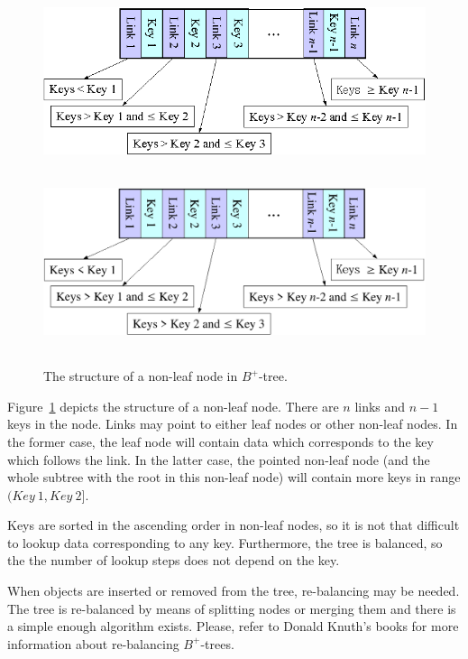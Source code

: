 %
%
\begin{figure}[h]
\begin{center}
\begin{htmlonly}
\includegraphics{pics/node-01.png}
\end{htmlonly}
\includegraphics[width=160mm,height=60mm]{pics/node-01.pdf}
\end{center}
\caption{The structure of a non-leaf node in $B^+$-tree.}
\label{ref_FigureNode_01}
\end{figure}

Figure~\ref{ref_FigureNode_01} depicts the structure of a \mbox{non-leaf}
node. There are $n$ links and $n-1$ keys in the node. Links may point to either
leaf nodes or other \mbox{non-leaf} nodes. In the former case, the leaf node
will contain data which corresponds to the key which follows the link. In the
latter case, the pointed \mbox{non-leaf} node (and the whole subtree with the
root in this \mbox{non-leaf} node) will contain more keys in range
$(Key~1, Key~2]$.

Keys are sorted in the ascending order in \mbox{non-leaf} nodes, so it is not
that difficult to lookup data corresponding to any key. Furthermore, the tree
is balanced, so the the number of lookup steps does not depend on the key.

When objects are inserted or removed from the tree, \mbox{re-balancing} may be
needed. The tree is \mbox{re-balanced} by means of splitting nodes or merging
them and there is a simple enough algorithm exists. Please, refer to Donald
Knuth's books for more information about \mbox{re-balancing}
\mbox{$B^+$-trees}.

